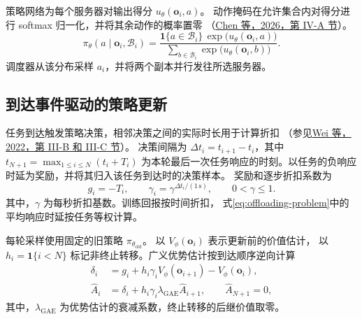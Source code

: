 \documentclass[UTF8,fontset=fandol]{ctexart}
\begin{document}
策略网络为每个服务器对输出得分 \(u_{\theta}(\boldsymbol{o}_i,a)\)。
动作掩码在允许集合内对得分进行 softmax 归一化，并将其余动作的概率置零
（\href{https://doi.org/10.1109/LWC.2026.3718001}{Chen 等，2026，第 IV-A 节}）。
\begin{equation}
  \pi_{\theta}(a\mid\boldsymbol{o}_i,\mathcal{B}_i)
  =
  \frac{\mathbf{1}\{a\in\mathcal{B}_i\}\,
        \exp\!\bigl(u_{\theta}(\boldsymbol{o}_i,a)\bigr)}
       {\sum_{b\in\mathcal{B}_i}
        \exp\!\bigl(u_{\theta}(\boldsymbol{o}_i,b)\bigr)} .
  \label{eq:masked-offloading-policy}
\end{equation}
调度器从该分布采样 \(a_i\)，并将两个副本并行发往所选服务器。

\subsection{到达事件驱动的策略更新}
\label{sec:event-driven-ppo-update}

任务到达触发策略决策，相邻决策之间的实际时长用于计算折扣
（参见\href{https://doi.org/10.1109/TWC.2022.3152573}{Wei 等，2022，第 III-B 和 III-C 节}）。
决策间隔为 \(\Delta t_i=t_{i+1}-t_i\)，其中 \(t_{N+1}=\max_{1\leq i\leq N}(t_i+T_i)\)
为本轮最后一次任务响应的时刻。以任务的负响应时延为奖励，并将其归入该任务到达时的决策样本。
奖励和逐步折扣系数为
\begin{equation}
  g_i=-T_i,\qquad
  \gamma_i=\gamma^{\Delta t_i/(1\,\mathrm{s})},\qquad 0<\gamma\leq 1 .
  \label{eq:offloading-reward-discount}
\end{equation}
其中，\(\gamma\) 为每秒折扣基数。训练回报按时间折扣，
式\eqref{eq:offloading-problem}中的平均响应时延按任务等权计算。

每轮采样使用固定的旧策略 \(\pi_{\theta_{\mathrm{old}}}\)。
以 \(V_{\phi}(\boldsymbol{o}_i)\) 表示更新前的价值估计，
以 \(h_i=\mathbf{1}\{i<N\}\) 标记非终止转移。广义优势估计按到达顺序逆向计算
\begin{equation}
  \begin{aligned}
    \delta_i &=
      g_i+h_i\gamma_i V_{\phi}(\boldsymbol{o}_{i+1})
          -V_{\phi}(\boldsymbol{o}_i),\\
    \widehat{A}_i &=
      \delta_i+h_i\gamma_i\lambda_{\mathrm{GAE}}\widehat{A}_{i+1},
      \qquad \widehat{A}_{N+1}=0 ,
  \end{aligned}
  \label{eq:time-discounted-gae}
\end{equation}
其中，\(\lambda_{\mathrm{GAE}}\) 为优势估计的衰减系数，终止转移的后继价值取零。
\end{document}
